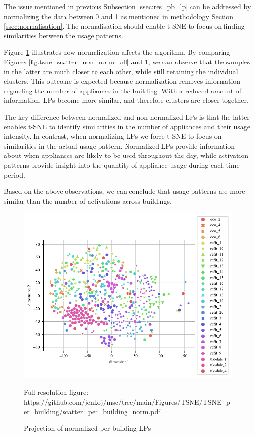 The issue mentioned in previous Subsection \ref{ssec:res_pb_lp} can be addressed by normalizing the data between 0 and 1 as mentioned in methodology Section \ref{ssec:normalisation}.
The normalisation should enable t-SNE to focus on finding similarities between the usage patterns.

Figure \ref{fig:tsne_pb_scatter_all_all} illustrates how normalization affects the algorithm.
By comparing Figures \ref{fig:tsne_scatter_non_norm_all} and \ref{fig:tsne_pb_scatter_all_all}, we can observe that the samples in the latter are much closer to each other, while still retaining the individual clusters.
This outcome is expected because normalization removes information regarding the number of appliances in the building.
With a reduced amount of information, LPs become more similar, and therefore clusters are closer together.

The key difference between normalized and non-normalized LPs is that the latter enables t-SNE to identify similarities in the number of appliances and their usage intensity.
In contrast, when normalizing LPs we force t-SNE to focus on similarities in the actual usage pattern. 
Normalized LPs provide information about when appliances are likely to be used throughout the day, while activation patterns provide insight into the quantity of appliance usage during each time period.

Based on the above observations, we can conclude that usage patterns are more similar than the number of activations across buildings.

\begin{figure}[H]
	\centering
	\caption{Projection of normalized per-building LPs}
	\includegraphics[]{Figures/TSNE/TSNE_per_building/scatter_per_building_norm.pdf}
	\label{fig:tsne_pb_scatter_all_all}
	\par
	\par\footnotesize{Full resolution figure: \url{https://github.com/jenkoj/msc/tree/main/Figures/TSNE/TSNE_per_building/scatter_per_building_norm.pdf}}
\end{figure}

